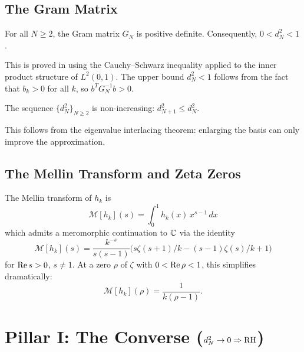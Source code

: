 \documentclass[11pt,a4paper]{article}
\begin{document}
\subsection{The Gram Matrix}

\begin{theorem}
\label{thm:posdef}
For all $N \geq 2$, the Gram matrix $G_N$ is positive definite.
Consequently, $0 < d_N^2 < 1$.
\end{theorem}

This is proved in  using the
Cauchy--Schwarz inequality applied to the inner product structure of
$L^2(0,1)$. The upper bound $d_N^2 < 1$ follows from the fact that
$b_k > 0$ for all $k$, so $b^T G_N^{-1} b > 0$.

\begin{theorem}
\label{thm:mono}
The sequence $\{d_N^2\}_{N \geq 2}$ is non-increasing: $d_{N+1}^2 \leq d_N^2$.
\end{theorem}

This follows from the eigenvalue interlacing theorem: enlarging the
basis can only improve the approximation.

\subsection{The Mellin Transform and Zeta Zeros}

The Mellin transform of $h_k$ is
\[
  \mathcal{M}[h_k](s) = \int_0^1 h_k(x)\,x^{s-1}\,dx
\]
which admits a meromorphic continuation to $\mathbb{C}$ via the identity
\begin{equation}
\label{eq:mellin-frac}
  \mathcal{M}[h_k](s) = \frac{k^{-s}}{s(s-1)} \bigl(
    s\zeta(s+1)/k - (s-1)\zeta(s)/k + 1
  \bigr)
\end{equation}
for $\operatorname{Re} s > 0$, $s \neq 1$. At a zero $\rho$ of $\zeta$ with
$0 < \operatorname{Re}\rho < 1$, this simplifies dramatically:
\begin{equation}
\label{eq:rank1}
  \mathcal{M}[h_k](\rho) = \frac{1}{k(\rho - 1)}.
\end{equation}

\section{Pillar I: The Converse ($d_N^2 \to 0 \Rightarrow \mathrm{RH}$)}
\label{sec:converse}
\end{document}
